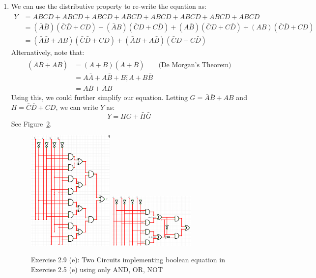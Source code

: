 \documentclass[12pt]{article}
\newenvironment{ex}[2][Exercise]{\begin{trivlist}
		\item[\hskip \labelsep {\bfseries #1}\hskip \labelsep {\bfseries #2.}]}{\end{trivlist}}
\begin{document}
\begin{ex}{2.9}
\begin{enumerate}[label=(\alph*)]
\begin{figure}
			\label{02-09d}
		\end{figure}
		\item We can use the distributive property to re-write the equation as:
		\begin{align}
			Y&=\bar{A}\bar{B}\bar{C}\bar{D}+\bar{A}\bar{B}CD+\bar{A}B\bar{C}D+\bar{A}BC\bar{D}+A\bar{B}\bar{C}D+A\bar{B}C\bar{D}+AB\bar{C}\bar{D}+ABCD
			\nonumber\\
			&=(\bar{A}\bar{B})(\bar{C}\bar{D}+CD)
			+(\bar{A}B)(\bar{C}D+C\bar{D})
			+(A\bar{B})(\bar{C}D+C\bar{D})
			+(AB)(\bar{C}\bar{D}+CD)\nonumber\\
			&=(\bar{A}\bar{B}+AB)(\bar{C}\bar{D}+CD)+
			(\bar{A}B+A\bar{B})(\bar{C}D+C\bar{D})\nonumber
		\end{align}
		Alternatively, note that:
		\begin{align*}
			\overline{(\bar{A}\bar{B}+AB)}&=
			(A+B)(\bar{A}+\bar{B})\qquad\text{(De Morgan's Theorem)}\\
			&=A\bar{A}+A\bar{B}+B\bar;{A}+B\bar{B}\\
			&=A\bar{B}+\bar{A}B
		\end{align*}
		Using this, we could further simplify our equation. Letting $G=\bar{A}\bar{B}+AB$ and
		$H=\bar{C}\bar{D}+CD$, we can write $Y$ as:
		\[
		Y=HG+\bar{H}\bar{G}
		\]
		See Figure~\ref{02-09e}.
		\begin{figure}
			\centering
			\includegraphics[width=0.4\textwidth]{02-09e-circuit}
			\includegraphics[width=0.4\textwidth]{02-09e-circuit-alternate}
			\caption{Exercise 2.9 (e): Two Circuits implementing boolean equation in Exercise 2.5 (e) using only AND, OR, NOT}
			\label{02-09e}
		\end{figure}
	\end{enumerate}
\end{ex}
\end{document}
